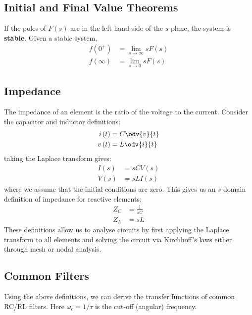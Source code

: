 \documentclass{article}
\begin{document}
\subsection{Initial and Final Value Theorems}
If the poles of \(F\left( s \right)\) are in the left hand side of the \(s\)-plane, the system is \textbf{stable}.
Given a stable system,
\begin{align*}
    f\left( 0^{+} \right)  & = \lim_{s \to \infty} s F\left( s \right) \\
    f\left( \infty \right) & = \lim_{s \to 0} s F\left( s \right)
\end{align*}
\subsection{Impedance}
The impedance of an element is the ratio of the voltage to the current.
Consider the capacitor and inductor definitions:
\begin{align*}
    i\left( t \right) & = C \odv{v}{t} \\
    v\left( t \right) & = L \odv{i}{t}
\end{align*}
taking the Laplace transform gives:
\begin{align*}
    I\left( s \right) & = sC V\left( s \right) \\
    V\left( s \right) & = sL I\left( s \right)
\end{align*}
where we assume that the initial conditions are zero. This gives us an \(s\)-domain definition of impedance for reactive elements:
\begin{align*}
    Z_C & = \frac{1}{sC} \\
    Z_L & = sL
\end{align*}
These definitions allow us to analyse circuits by first applying
the Laplace transform to all elements and solving the circuit via Kirchhoff's laws either through mesh or nodal analysis.
\subsection{Common Filters}
Using the above definitions, we can derive the transfer functions of common RC/RL filters.
Here \(\omega_c = 1/\tau\) is the cut-off (angular) frequency.
\end{document}
